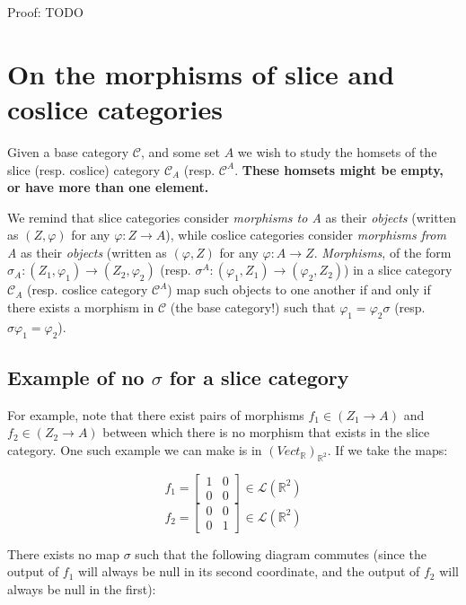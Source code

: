 Proof: TODO





\section*{On the morphisms of slice and coslice categories}

Given a base category $\mathcal{C}$, and some set $A$ we wish to study the homsets of the slice (resp. coslice) category $\mathcal{C}_A$ (resp. $\mathcal{C}^A$. \textbf{These homsets might be empty, or have more than one element.}

We remind that slice categories consider \textit{morphisms to A} as their \textit{objects} (written as $(Z, \varphi)$ for any $\varphi : Z \to A$), while coslice categories consider \textit{morphisms from A} as their \textit{objects} (written as $(\varphi, Z)$ for any $\varphi : A \to Z$. \textit{Morphisms}, of the form $\sigma_A : (Z_1, \varphi_1) \to (Z_2, \varphi_2)$ (resp. $\sigma^A : (\varphi_1, Z_1) \to (\varphi_2, Z_2)$) in a slice category $\mathcal{C}_A$ (resp. coslice category $\mathcal{C}^A$) map such objects to one another if and only if there exists a morphism in $\mathcal{C}$ (the base category!) such that $\varphi_1 = \varphi_2 \sigma$ (resp. $\sigma \varphi_1 = \varphi_2$).


\subsection*{Example of no $\sigma$ for a slice category}

For example, note that there exist pairs of morphisms $f_1 \in (Z_1 \to A)$ and $f_2 \in (Z_2 \to A)$ between which there is no morphism that exists in the slice category. One such example we can make is in $(Vect_\mathbb{R})_{\mathbb{R}^2}$. If we take the maps:

$$f_1 = \begin{bmatrix} 1 & 0 \\ 0 & 0 \end{bmatrix} \in \mathcal{L}(\mathbb{R}^2)$$
$$f_2 = \begin{bmatrix} 0 & 0 \\ 0 & 1 \end{bmatrix} \in \mathcal{L}(\mathbb{R}^2)$$

There exists no map $\sigma$ such that the following diagram commutes (since the output of $f_1$ will always be null in its second coordinate, and the output of $f_2$ will always be null in the first):

